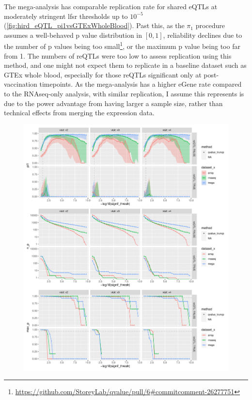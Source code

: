 The mega-analysis has comparable replication rate for shared \glspl{eQTL} at moderately stringent \gls{lfsr} thresholds up to $10^{-5}$ (\autoref{fig:hird_eQTL_pi1vsGTExWholeBlood}).
Past this, as the $\pi_1$ procedure assumes a well-behaved p value distribution in $\left[0, 1\right]$, reliability declines due to the number of p values being too small\footnote{\url{https://github.com/StoreyLab/qvalue/pull/6\#commitcomment-26277751}}, or the maximum p value being too far from 1.
The numbers of \glspl{reQTL} were too low to assess replication using this method, and one might not expect them to replicate in a baseline dataset such as GTEx whole blood, especially for those \glspl{reQTL} significant only at post-vaccination timepoints.
As the mega-analysis has a higher eGene rate  compared to the \gls{RNAseq}-only analysis, with similar replication,
I assume this represents is due to the power advantage from having larger a sample size, rather than technical effects from merging the expression data.

\begin{figure}
    \centering
    \includegraphics[width=1.0\textwidth,page=1]{mainmatter/figures/chapter_03/compute_pi1.pi1_by_thresholds.pdf}
    \caption{}
    \label{fig:hird_eQTL_pi1vsGTExWholeBlood}
\end{figure}


